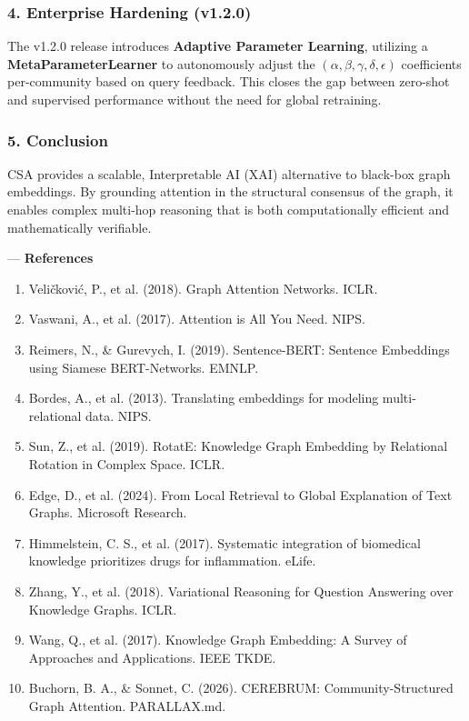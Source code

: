 \documentclass[10pt,journal,compsoc]{IEEEtran}
\begin{document}
\subsubsection{4. Enterprise Hardening (v1.2.0)}
The v1.2.0 release introduces \textbf{Adaptive Parameter Learning}, utilizing a \textbf{MetaParameterLearner} to auton\-omously adjust the $(\alpha, \beta, \gamma, \delta, \epsilon)$ coeff\-icients per-community based on query feedback. This closes the gap between zero-shot and supervised performance without the need for global retraining.

\subsubsection{5. Conclusion}
CSA provides a scalable, Interp\-retable AI (XAI) alternative to black-box graph embeddings. By grounding attention in the structural consensus of the graph, it enables complex multi-hop reasoning that is both compu\-tationally efficient and mathe\-matically verifiable.

---
\textbf{References}
\begin{enumerate}
\item Veličković, P., et al. (2018). Graph Attention Networks. ICLR.
\item Vaswani, A., et al. (2017). Attention is All You Need. NIPS.
\item Reimers, N., \& Gurevych, I. (2019). Sentence-BERT: Sentence Embeddings using Siamese BERT-Networks. EMNLP.
\item Bordes, A., et al. (2013). Translating embeddings for modeling multi-relational data. NIPS.
\item Sun, Z., et al. (2019). RotatE: Knowledge Graph Embedding by Relational Rotation in Complex Space. ICLR.
\item Edge, D., et al. (2024). From Local Retrieval to Global Explanation of Text Graphs. Microsoft Research.
\item Himmelstein, C. S., et al. (2017). Systematic integration of biomedical knowledge prioritizes drugs for infla\-mmation. eLife.
\item Zhang, Y., et al. (2018). Variational Reasoning for Question Answering over Knowledge Graphs. ICLR.
\item Wang, Q., et al. (2017). Knowledge Graph Embedding: A Survey of Approaches and Applic\-ations. IEEE TKDE.
\item Buchorn, B. A., \& Sonnet, C. (2026). CEREBRUM: Community-Structured Graph Attention. PARALLAX.md.

\end{enumerate}



\end{document}
